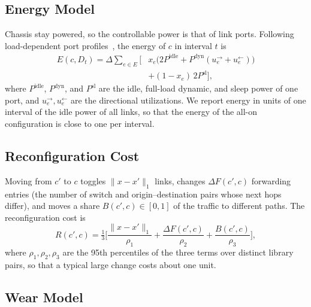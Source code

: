\documentclass[journal]{IEEEtran}
\begin{document}
\subsection{Energy Model}

Chassis stay powered, so the controllable power is that of link ports. Following load-dependent port profiles~\cite{restrepo2009energy,mahadevan2009power,vishwanath2014modeling}, the energy of $c$ in interval $t$ is
\begin{equation}\label{eq:energy}
\begin{split}E(c,D_t)=\Delta\sum_{e\in E}\Big[&x_e\big(2P^{\mathrm{idle}}+P^{\mathrm{dyn}}(u_e^{\rightarrow}+u_e^{\leftarrow})\big)\\
&+(1-x_e)\,2P^{\mathrm{sl}}\Big],\end{split}
\end{equation}
where $P^{\mathrm{idle}}$, $P^{\mathrm{dyn}}$, and $P^{\mathrm{sl}}$ are the idle, full-load dynamic, and sleep power of one port, and $u_e^{\rightarrow},u_e^{\leftarrow}$ are the directional utilizations. We report energy in units of one interval of the idle power of all links, so that the energy of the all-on configuration is close to one per interval.

\subsection{Reconfiguration Cost}

Moving from $c'$ to $c$ toggles $\|x-x'\|_1$ links, changes $\Delta F(c',c)$ forwarding entries (the number of switch and origin--destination pairs whose next hops differ), and moves a share $B(c',c)\in[0,1]$ of the traffic to different paths. The reconfiguration cost is
\begin{equation}\label{eq:reconf}
R(c',c)=\tfrac13\Big[\frac{\|x-x'\|_1}{\rho_1}+\frac{\Delta F(c',c)}{\rho_2}+\frac{B(c',c)}{\rho_3}\Big],
\end{equation}
where $\rho_1,\rho_2,\rho_3$ are the 95th percentiles of the three terms over distinct library pairs, so that a typical large change costs about one unit.

\subsection{Wear Model}
\end{document}
